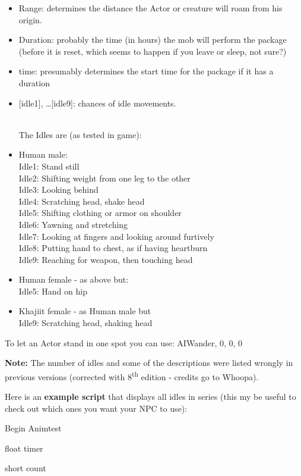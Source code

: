 \documentclass[
]{article}
\begin{document}
\begin{itemize}
\item
  Range: determines the distance the Actor or creature will roam from
  his origin.
\item
  Duration: probably the time (in hours) the mob will perform the
  package (before it is reset, which seems to happen if you leave or
  sleep, not sure?)
\item
  time: presumably determines the start time for the package if it has a
  duration
\item
  {[}idle1{]}, \ldots{[}idle9{]}: chances of idle movements.\\
  \strut \\
  The Idles are (as tested in game):
\item
  Human male:\\
  Idle1: Stand still\\
  Idle2: Shifting weight from one leg to the other\\
  Idle3: Looking behind\\
  Idle4: Scratching head, shake head\\
  Idle5: Shifting clothing or armor on shoulder\\
  Idle6: Yawning and stretching\\
  Idle7: Looking at fingers and looking around furtively\\
  Idle8: Putting hand to chest, as if having heartburn\\
  Idle9: Reaching for weapon, then touching head
\item
  Human female - as above but:\\
  Idle5: Hand on hip
\item
  Khajiit female - as Human male but\\
  Idle9: Scratching head, shaking head
\end{itemize}

To let an Actor stand in one spot you can use: AIWander, 0, 0, 0

\textbf{Note:} The number of idles and some of the descriptions were
listed wrongly in previous versions (corrected with
8\textsuperscript{th} edition - credits go to Whoopa).

Here is an \textbf{example script} that displays all idles in series
(this my be useful to check out which ones you want your NPC to use):

Begin Animtest

float timer

short count
\end{document}
